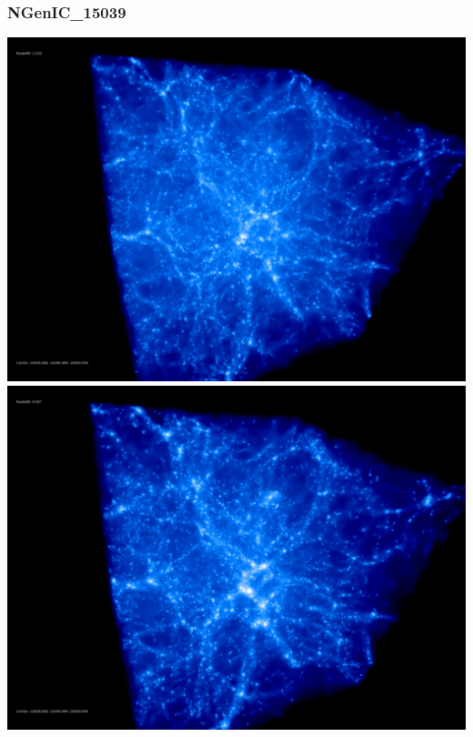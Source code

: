 % 
%
%
%
%
%
%
%


\newpage
\subsubsection{NGenIC\_15039}

\includegraphics[scale=0.1]{r256/h100/NGenIC_15039/50.jpg} 
\includegraphics[scale=0.1]{r256/h100/NGenIC_15039/100.jpg}  \\

